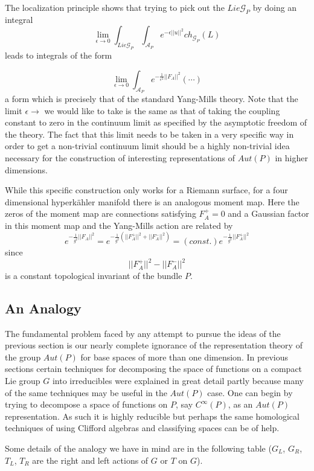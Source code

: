 \documentclass[a4paper,a4paper]{article}
\theoremstyle{conjecture}
\begin{document}
The localization
principle shows that trying to pick out the $Lie{\mathcal G}_P$
by doing an integral 
$$\lim_{\epsilon\rightarrow 0}\int_{Lie{\mathcal G}_P}\int_{{\mathcal A}_P}e^{-\epsilon ||u||^2}ch_{{\mathcal G}_P}(L)$$
leads to integrals of the form

$$\lim_{\epsilon\rightarrow 0} \int_{{\mathcal A}_P} e^{-\frac{1}{\epsilon ^2}{||F_A||^2}}(\cdots)$$
a form which is precisely that of the standard Yang-Mills theory.  Note that the limit $\epsilon\rightarrow$ we
would like to take is the same as that of taking the coupling constant to zero in the continuum limit as
specified by the asymptotic freedom of the theory.  The fact that this limit needs to be taken in a very
specific way in order to get a non-trivial continuum limit should be a highly non-trivial idea necessary
for the construction of interesting representations of $Aut(P)$ in higher dimensions.

While this specific construction only works for a Riemann surface, for a four dimensional hyperk\"ahler
manifold there is an analogous moment map. Here the zeros of the moment map are connections satisfying
$F^+_A=0$ and a Gaussian factor in this moment map and the Yang-Mills action are related by
$$e^{-\frac{1}{g^2}||F_A||^2}=e^{-\frac{1}{g^2}(||F^+_A||^2+||F^-_A||^2)}=(const.)e^{-\frac{1}{g^2}||F^+_A||^2}$$
since 
$$||F^+_A||^2-||F^-_A||^2$$
is a constant topological invariant of the bundle $P$.

\subsection{An Analogy}

The fundamental problem faced by any attempt to pursue the ideas of the previous section is
our nearly complete ignorance of the representation theory of the group $Aut(P)$ for
base spaces of more than one dimension.  In previous sections certain techniques for
decomposing 
the space of functions on a compact Lie group $G$ into irreducibles were explained in great detail partly because many of
the same techniques may be useful in the $Aut(P)$ case.  One can begin by trying to decompose
a space of functions on $P$, say $C^\infty (P)$, as an $Aut(P)$ representation.  As such it is
highly reducible but perhaps the same homological techniques of using Clifford algebras and
classifying spaces can be of help.  

Some details of the analogy we have in mind are in the following table
 ($G_L$, $G_R$, $T_L$, $T_R$ are the right and left actions of $G$ or 
$T$ on $G$).
\end{document}
